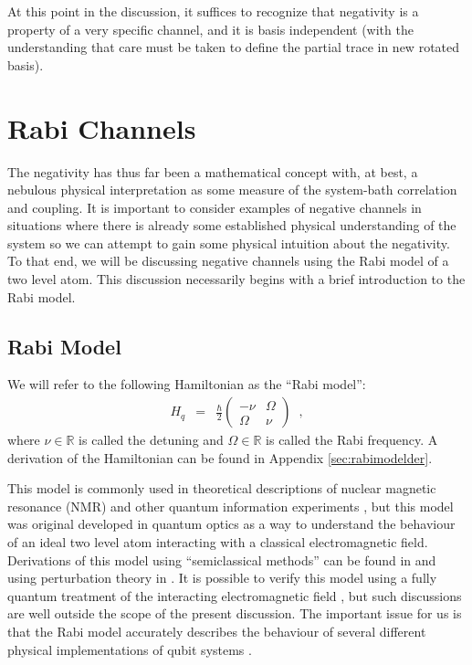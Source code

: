 At this point in the discussion, it suffices to recognize that negativity is a property of a very specific channel, and it is basis independent (with the understanding that care must be taken to define the partial trace in new rotated basis).

\chapter{Rabi Channels}
\label{sec:rabi}

The negativity has thus far been a mathematical concept with, at best, a nebulous physical interpretation as some measure of the system-bath correlation and coupling.  It is important to consider examples of negative channels in situations where there is already some established physical understanding of the system so we can attempt to gain some physical intuition about the negativity.  To that end, we will be discussing negative channels using the Rabi model of a two level atom.  This discussion necessarily begins with a brief introduction to the Rabi model.

\section{Rabi Model}

We will refer to the following Hamiltonian as the ``Rabi model'':
\begin{eqnarray*}
H_q &=& \frac{\hbar}{2}\begin{pmatrix}
-\nu & \Omega\\
\Omega & \nu
\end{pmatrix}\;\;,
\end{eqnarray*}
where $\nu\in\mathbb{R}$ is called the detuning and $\Omega\in\mathbb{R}$ is called the Rabi frequency.  A derivation of the Hamiltonian can be found in Appendix \ref{sec:rabimodelder}.

This model is commonly used in theoretical descriptions of nuclear magnetic resonance (NMR) and other quantum information experiments \cite{Mikio2008}, but this model was original developed in quantum optics as a way to understand the behaviour of an ideal two level atom interacting with a classical electromagnetic field.  Derivations of this model using ``semiclassical methods'' can be found in \cite{Kok2010,Barnett2002,Mandel1995,Loudon2000} and using perturbation theory in \cite{Loudon2000,Orszag2008,Suter1997}.  It is possible to verify this model using a fully quantum treatment of the interacting electromagnetic field \cite{Barnett2002}, but such discussions are well outside the scope of the present discussion.  The important issue for us is that the Rabi model accurately describes the behaviour of several different physical implementations of qubit systems \cite{Mikio2008}.


